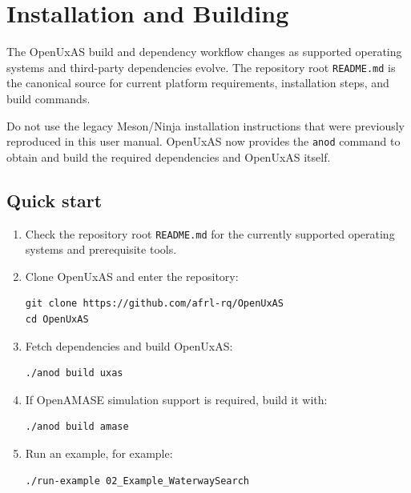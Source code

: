 \section{Installation and Building}\label{installation-and-building}

The OpenUxAS build and dependency workflow changes as supported operating
systems and third-party dependencies evolve. The repository root
\texttt{README.md} is the canonical source for current platform requirements,
installation steps, and build commands.

Do not use the legacy Meson/Ninja installation instructions that were
previously reproduced in this user manual. OpenUxAS now provides the
\texttt{anod} command to obtain and build the required dependencies and
OpenUxAS itself.

\subsection{Quick start}\label{quick-start}

\begin{enumerate}
\item
  Check the repository root \texttt{README.md} for the currently supported
  operating systems and prerequisite tools.
\item
  Clone OpenUxAS and enter the repository:

\begin{verbatim}
git clone https://github.com/afrl-rq/OpenUxAS
cd OpenUxAS
\end{verbatim}

\item
  Fetch dependencies and build OpenUxAS:

\begin{verbatim}
./anod build uxas
\end{verbatim}

\item
  If OpenAMASE simulation support is required, build it with:

\begin{verbatim}
./anod build amase
\end{verbatim}

\item
  Run an example, for example:

\begin{verbatim}
./run-example 02_Example_WaterwaySearch
\end{verbatim}
\end{enumerate}

